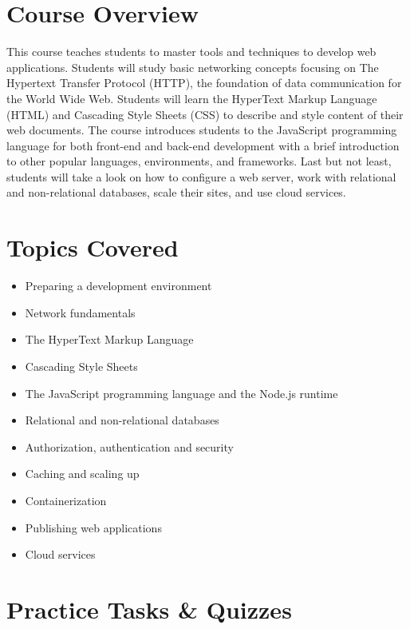 \documentclass[12pt,a4paper,oneside]{article}
\begin{document}
    \section{Course Overview}

        This course teaches students to master tools and techniques to develop
        web applications. Students will study basic networking concepts focusing
        on The Hypertext Transfer Protocol (HTTP), the foundation of data
        communication for the World Wide Web. Students will learn the HyperText
        Markup Language (HTML) and Cascading Style Sheets (CSS) to describe and
        style content of their web documents. The course introduces students to
        the JavaScript programming language for both front-end and back-end
        development with a brief introduction to other popular languages,
        environments, and frameworks. Last but not least, students will take a
        look on how to configure a web server, work with relational and
        non-relational databases, scale their sites, and use cloud services.

    \section{Topics Covered}

        \begin{itemize}
            \item Preparing a development environment
            \item Network fundamentals
            \item The HyperText Markup Language
            \item Cascading Style Sheets
            \item The JavaScript programming language and the Node.js runtime
            \item Relational and non-relational databases
            \item Authorization, authentication and security
            \item Caching and scaling up
            \item Containerization
            \item Publishing web applications
            \item Cloud services
        \end{itemize}

    \section{Practice Tasks \& Quizzes}
\end{document}
